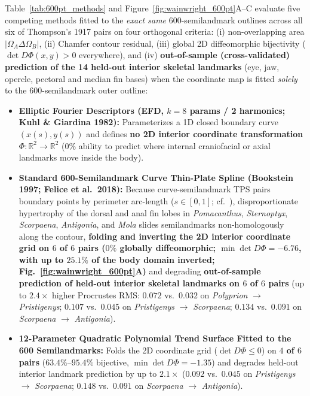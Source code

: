 \documentclass[11pt,a4paper]{article}
\theoremstyle{definition}
\theoremstyle{remark}
\newcommand{\R}{\mathbb{R}}
\begin{document}
Table~\ref{tab:600pt_methods} and Figure~\ref{fig:wainwright_600pt}A--C evaluate five competing methods fitted to the \emph{exact same} 600-semilandmark outlines across all six of Thompson's 1917 pairs on four orthogonal criteria: (i) non-overlapping area $|\Omega_A \Delta \Omega_B|$, (ii) Chamfer contour residual, (iii) global 2D diffeomorphic bijectivity ($\det D\Phi(x,y) > 0$ everywhere), and (iv) \textbf{out-of-sample (cross-validated) prediction of the 14 held-out interior skeletal landmarks} (eye, jaw, opercle, pectoral and median fin bases) when the coordinate map is fitted \emph{solely} to the 600-semilandmark outer outline:
\begin{itemize}
  \item \textbf{Elliptic Fourier Descriptors (EFD, $k = 8$ params / 2 harmonics; Kuhl \& Giardina 1982):} Parameterizes a 1D closed boundary curve $(x(s), y(s))$ and defines \textbf{no 2D interior coordinate transformation $\Phi: \R^2 \to \R^2$} ($0\%$ ability to predict where internal craniofacial or axial landmarks move inside the body).
  \item \textbf{Standard 600-Semilandmark Curve Thin-Plate Spline (Bookstein 1997; Felice et al.\ 2018):} Because curve-semilandmark TPS pairs boundary points by perimeter arc-length ($s \in [0, 1]$; cf.~\cite{Bookstein1997,Felice2018SysBio}), disproportionate hypertrophy of the dorsal and anal fin lobes in \emph{Pomacanthus}, \emph{Sternoptyx}, \emph{Scorpaena}, \emph{Antigonia}, and \emph{Mola} slides semilandmarks non-homologously along the contour, \textbf{folding and inverting the 2D interior coordinate grid on $6$ of $6$ pairs ($0\%$ globally diffeomorphic; $\min \det D\Phi = -6.76$, with up to $25.1\%$ of the body domain inverted; Fig.~\ref{fig:wainwright_600pt}A)} and degrading \textbf{out-of-sample prediction of held-out interior skeletal landmarks on $6$ of $6$ pairs} (up to $2.4\times$ higher Procrustes RMS: $0.072$ vs.\ $\mathbf{0.032}$ on \emph{Polyprion} $\to$ \emph{Pristigenys}; $0.107$ vs.\ $\mathbf{0.045}$ on \emph{Pristigenys} $\to$ \emph{Scorpaena}; $0.134$ vs.\ $\mathbf{0.091}$ on \emph{Scorpaena} $\to$ \emph{Antigonia}).
  \item \textbf{12-Parameter Quadratic Polynomial Trend Surface Fitted to the 600 Semilandmarks:} Folds the 2D coordinate grid ($\det D\Phi \le 0$) on \textbf{$4$ of $6$ pairs} ($63.4\%\text{--}95.4\%$ bijective, $\min \det D\Phi = -1.35$) and degrades held-out interior landmark prediction by up to $2.1\times$ ($0.092$ vs.\ $\mathbf{0.045}$ on \emph{Pristigenys} $\to$ \emph{Scorpaena}; $0.148$ vs.\ $\mathbf{0.091}$ on \emph{Scorpaena} $\to$ \emph{Antigonia}).

\end{itemize}
\end{document}

